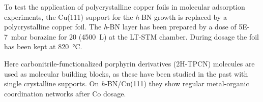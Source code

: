 To test the application of polycrystalline copper foils in molecular adsorption experiments, the Cu(111) support for the \textit{h}-BN growth is replaced by a polycrystalline copper foil. The \textit{h}-BN layer has been prepared by a dose of \SI{5E-7}{\milli\bar} borazine for \SI{20}{\min} (\SI{4500}{\L}) at the LT-STM chamber. During dosage the foil has been kept at \SI{820}{\celsius}. 

Here carbonitrile-functionalized porphyrin derivatives (2H-TPCN) molecules are used as molecular building blocks, as these have been studied in the past \cite{urgel_controlling_2015} with single crystalline supports. On \textit{h}-BN/Cu(111) they show regular metal-organic coordination networks after Co dosage.
%  
%  
%  
%  
% 

